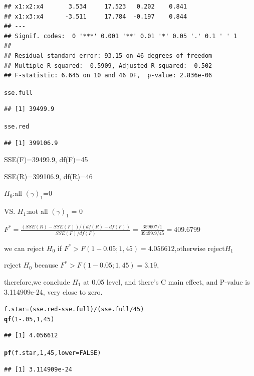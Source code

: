 \documentclass{article}\usepackage[]{graphicx}\usepackage[]{color}
\makeatletter
\newcommand{\hlnum}[1]{\textcolor[rgb]{0.686,0.059,0.569}{#1}}%
\newcommand{\hlopt}[1]{\textcolor[rgb]{0,0,0}{#1}}%
\newcommand{\hlstd}[1]{\textcolor[rgb]{0.345,0.345,0.345}{#1}}%
\newcommand{\hlkwb}[1]{\textcolor[rgb]{0.69,0.353,0.396}{#1}}%
\newcommand{\hlkwc}[1]{\textcolor[rgb]{0.333,0.667,0.333}{#1}}%
\newcommand{\hlkwd}[1]{\textcolor[rgb]{0.737,0.353,0.396}{\textbf{#1}}}%
\newenvironment{kframe}{%
 \def\at@end@of@kframe{}%
 \ifinner\ifhmode%
  \def\at@end@of@kframe{\end{minipage}}%
  \begin{minipage}{\columnwidth}%
 \fi\fi%
 \def\FrameCommand##1{\hskip\@totalleftmargin \hskip-\fboxsep
 \colorbox{shadecolor}{##1}\hskip-\fboxsep
     \hskip-\linewidth \hskip-\@totalleftmargin \hskip\columnwidth}%
 \MakeFramed {\advance\hsize-\width
   \@totalleftmargin\z@ \linewidth\hsize
   \@setminipage}}%
 {\par\unskip\endMakeFramed%
 \at@end@of@kframe}
\newenvironment{knitrout}{}{} %
\makeatother
\begin{document}
\begin{enumerate}[(a)]
\begin{knitrout}
\begin{kframe}
\begin{verbatim}
## x1:x2:x4       3.534     17.523   0.202    0.841    
## x1:x3:x4      -3.511     17.784  -0.197    0.844    
## ---
## Signif. codes:  0 '***' 0.001 '**' 0.01 '*' 0.05 '.' 0.1 ' ' 1
## 
## Residual standard error: 93.15 on 46 degrees of freedom
## Multiple R-squared:  0.5909,	Adjusted R-squared:  0.502 
## F-statistic: 6.645 on 10 and 46 DF,  p-value: 2.836e-06
\end{verbatim}
\begin{alltt}
  \hlstd{sse.full}
\end{alltt}
\begin{verbatim}
## [1] 39499.9
\end{verbatim}
\begin{alltt}
  \hlstd{sse.red}
\end{alltt}
\begin{verbatim}
## [1] 399106.9
\end{verbatim}
\end{kframe}
\end{knitrout}

SSE(F)=39499.9, df(F)=45

SSE(R)=399106.9, df(R)=46

\begin{center}
$H_0$:all $(\gamma)_{1}$=0

VS. $H_1$:not all $(\gamma)_{1}$ = 0

$F^*=\frac{(SSE(R)-SSE(F))/(df(R)-df(F))}{SSE(F)/df(F)} = \frac{359607/1}{39499.9/45} = 409.6799$

we can reject $H_0$ if $F^* > F(1-0.05;1,45)=4.056612$,otherwise reject$H_1$

reject $H_0$ because $F^*>F(1-0.05;1,45)=3.19$,

therefore,we conclude $H_1$ at 0.05 level, and there's C main effect, and P-value is 3.114909e-24, very close to zero.
\end{center}

\begin{knitrout}
\color{fgcolor}\begin{kframe}
\begin{alltt}
  \hlstd{f.star} \hlkwb{=} \hlstd{(sse.red} \hlopt{-} \hlstd{sse.full)} \hlopt{/} \hlstd{(sse.full}\hlopt{/}\hlnum{45}\hlstd{)}
  \hlkwd{qf}\hlstd{(}\hlnum{1} \hlopt{-} \hlnum{.05}\hlstd{,} \hlnum{1}\hlstd{,} \hlnum{45}\hlstd{)}
\end{alltt}
\begin{verbatim}
## [1] 4.056612
\end{verbatim}
\begin{alltt}
  \hlkwd{pf}\hlstd{(f.star,} \hlnum{1}\hlstd{,} \hlnum{45}\hlstd{,} \hlkwc{lower} \hlstd{=} \hlnum{FALSE}\hlstd{)}
\end{alltt}
\begin{verbatim}
## [1] 3.114909e-24
\end{verbatim}
\end{kframe}
\end{knitrout}


\end{enumerate}
\end{document}
